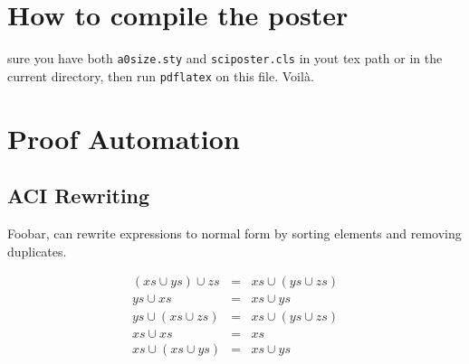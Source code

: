\documentclass[portrait]{sciposter}
\begin{document}
\begin{multicols}{3}
\section{How to compile the poster}
 sure you have both {\tt a0size.sty} and {\tt sciposter.cls} in yout tex path or in the current directory, then run {\tt pdflatex} on this file. Voil\`a.

\section{Proof Automation}

\subsection{ACI Rewriting}
Foobar, can rewrite expressions to normal form by sorting elements and removing duplicates.\\
\begin{sectionbox}{}
\begin{eqnarray}
(xs\cup ys)\cup zs & = & xs\cup(ys\cup zs)\nonumber \\
ys\cup xs & = & xs\cup ys\nonumber \\
ys\cup(xs\cup zs) & = & xs\cup(ys\cup zs)\nonumber \\
xs\cup xs & = & xs\nonumber \\
xs\cup(xs\cup ys) & = & xs\cup ys\nonumber
\end{eqnarray}
\end{sectionbox}


\end{multicols}
\end{document}
